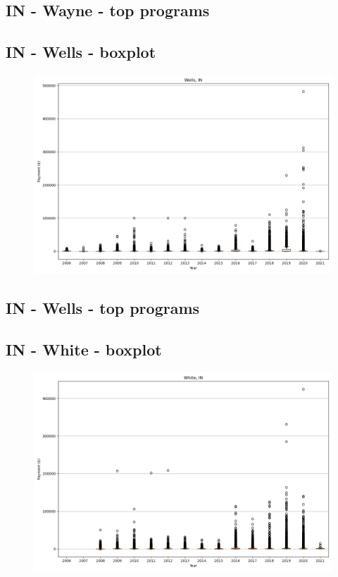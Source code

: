 \subsection*{IN - Wayne - top programs}

\newpage
\subsection*{IN - Wells - boxplot}
\begin{figure}[h]
\centering
\includegraphics[width=7in]{../output/boxplots/counties/Wells-IN_boxplot.png}
\end{figure}


\subsection*{IN - Wells - top programs}

\newpage
\subsection*{IN - White - boxplot}
\begin{figure}[h]
\centering
\includegraphics[width=7in]{../output/boxplots/counties/White-IN_boxplot.png}
\end{figure}


